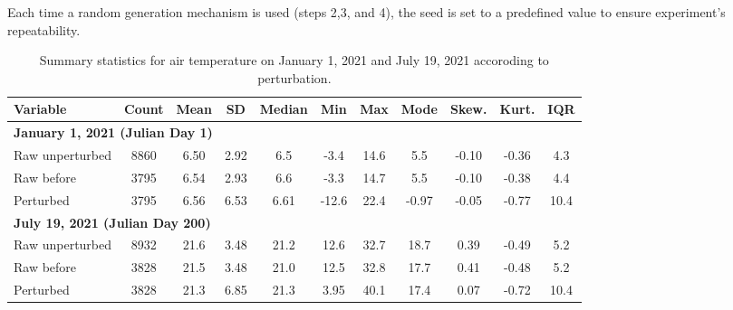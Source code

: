 \documentclass[authoryear,preprint,review,12pt]{elsarticle}
\begin{document}
Each time a random generation mechanism is used (steps 2,3, and 4), the seed is set to a predefined value to ensure experiment's repeatability.

\begin{table}[h]
    \begin{tiny}
    \centering
    \begin{tabular}{lcccccccccc}  %
        \toprule
        \textbf{Variable} & \textbf{Count} & \textbf{Mean} & \textbf{SD} & \textbf{Median} & \textbf{Min} & \textbf{Max} & \textbf{Mode} & \textbf{Skew.} & \textbf{Kurt.} & \textbf{IQR} \\
        \midrule
        \multicolumn{11}{l}{\textbf{January 1, 2021 (Julian Day 1)}} \\
        Raw unperturbed  & 8860  & 6.50  & 2.92  & 6.5   & -3.4  & 14.6  & 5.5   & -0.10  & -0.36  & 4.3  \\
        Raw before       & 3795  & 6.54  & 2.93  & 6.6   & -3.3  & 14.7  & 5.5   & -0.10  & -0.38  & 4.4  \\
        Perturbed        & 3795  & 6.56  & 6.53  & 6.61  & -12.6 & 22.4  & -0.97 & -0.05  & -0.77  & 10.4 \\
        \midrule
        \multicolumn{11}{l}{\textbf{July 19, 2021 (Julian Day 200)}} \\
        Raw unperturbed  & 8932  & 21.6  & 3.48  & 21.2  & 12.6  & 32.7  & 18.7  & 0.39   & -0.49  & 5.2  \\
        Raw before       & 3828  & 21.5  & 3.48  & 21.0  & 12.5  & 32.8  & 17.7  & 0.41   & -0.48  & 5.2  \\
        Perturbed        & 3828  & 21.3  & 6.85  & 21.3  & 3.95  & 40.1  & 17.4  & 0.07   & -0.72  & 10.4 \\
        \bottomrule
    \end{tabular}
    \caption{Summary statistics for air temperature on January 1, 2021 and July 19, 2021 accoroding to perturbation.}
    \label{tab:stats_perturbation}    
    \end{tiny}
\end{table}
\end{document}
